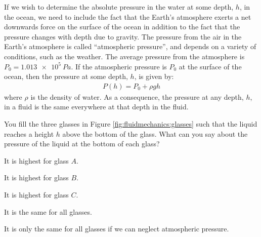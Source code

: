 If we wish to determine the absolute pressure in the water at some depth, $h$, in the ocean, we need to include the fact that the Earth's atmosphere exerts a net downwards force on the surface of the ocean in addition to the fact that the pressure changes with depth due to gravity. The pressure from the air in the Earth's atmosphere is called ``atmospheric pressure'', and depends on a variety of conditions, such as the weather. The average pressure from the atmosphere is $P_0=\SI{1.013e5}{Pa}$. If the atmospheric pressure is $P_0$ at the surface of the ocean, then the pressure at some depth, $h$, is given by:
\begin{align*}
P(h) = P_0 + \rho g h
\end{align*}
where $\rho$ is the density of water. As a consequence, the pressure at any depth, $h$, in a fluid is the same everywhere at that depth in the fluid. 
\begin{checkpoint}
\begin{MCquestion}{You fill the three glasses in Figure \ref{fig:fluidmechanics:glasses} such that the liquid reaches a height $h$ above the bottom of the glass. What can you say about the pressure of the liquid at the bottom of each glass?}
\item It is highest for glass $A$.
\item It is highest for glass $B$.
\item It is highest for glass $C$.
\item It is the same for all glasses. \correct
\item It is only the same for all glasses if we can neglect atmospheric pressure. 
\end{MCquestion}
\end{checkpoint}
\vspace{-0.25cm}
